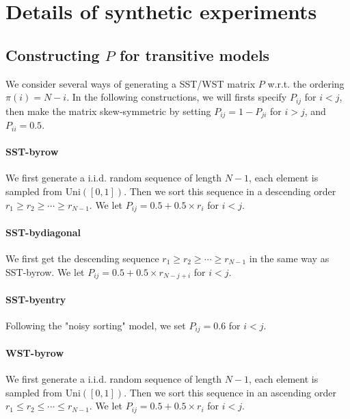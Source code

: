 \section{Details of synthetic experiments}


\subsection{Constructing $P$ for transitive models}
\label{sec:appendix-generatingP}

We consider several  ways of generating a SST/WST matrix $P$ w.r.t. the ordering $\pi(i)=N-i$. In the following constructions, we will firsts specify $P_{ij}$ for $i<j$, then make the matrix skew-symmetric by setting $P_{ij}=1-P_{ji}$ for $i>j$, and $P_{ii}=0.5$. 

\paragraph{SST-byrow} We first generate a i.i.d. random sequence of length $N-1$, each element is sampled from $\text{Uni}([0,1])$. Then we sort this sequence in a descending order $r_1 \geq r_2 \geq \cdots \geq r_{N-1} $. We let $P_{ij}=0.5+0.5 \times r_i$ for $i<j$.

\paragraph{SST-bydiagonal} We first get the descending sequence $r_1 \geq r_2 \geq \cdots \geq r_{N-1} $ in the same way as SST-byrow. We let $P_{ij}=0.5+0.5 \times r_{N-j+i}$ for $i<j$.

\paragraph{SST-byentry} 
Following the "noisy sorting" model, we set 
$P_{ij}=0.6$ for $i<j$.



\paragraph{WST-byrow} We first generate a i.i.d. random sequence of length $N-1$, each element is sampled from $\text{Uni}([0,1])$. Then we sort this sequence in an ascending  order $r_1 \leq r_2 \leq \cdots \leq r_{N-1} $. We let $P_{ij}=0.5+0.5 \times r_i$ for $i<j$.

